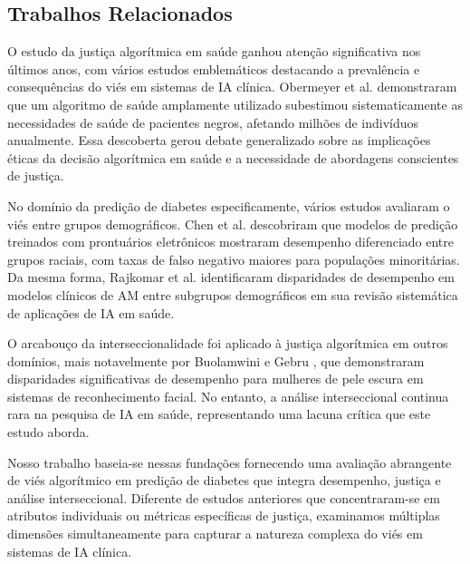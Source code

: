 \subsection{Trabalhos Relacionados}

O estudo da justiça algorítmica em saúde ganhou atenção significativa nos 
últimos anos, com vários estudos emblemáticos destacando a prevalência e 
consequências do viés em sistemas de IA clínica. Obermeyer et al. 
\cite{obermeyer2019} demonstraram que um algoritmo de saúde amplamente 
utilizado subestimou sistematicamente as necessidades de saúde de pacientes 
negros, afetando milhões de indivíduos anualmente. Essa descoberta gerou 
debate generalizado sobre as implicações éticas da decisão algorítmica 
em saúde e a necessidade de abordagens conscientes de justiça.

No domínio da predição de diabetes especificamente, vários estudos avaliaram 
o viés entre grupos demográficos. Chen et al. \cite{chen2019} descobriram 
que modelos de predição treinados com prontuários eletrônicos mostraram 
desempenho diferenciado entre grupos raciais, com taxas de falso negativo 
maiores para populações minoritárias. Da mesma forma, Rajkomar et al. 
\cite{rajkomar2018} identificaram disparidades de desempenho em modelos 
clínicos de AM entre subgrupos demográficos em sua revisão sistemática de 
aplicações de IA em saúde.

O arcabouço da interseccionalidade foi aplicado à justiça algorítmica em 
outros domínios, mais notavelmente por Buolamwini e Gebru \cite{buolamwini2018}, 
que demonstraram disparidades significativas de desempenho para mulheres de 
pele escura em sistemas de reconhecimento facial. No entanto, a análise 
interseccional continua rara na pesquisa de IA em saúde, representando uma 
lacuna crítica que este estudo aborda.

Nosso trabalho baseia-se nessas fundações fornecendo uma avaliação 
abrangente de viés algorítmico em predição de diabetes que integra desempenho, 
justiça e análise interseccional. Diferente de estudos anteriores que 
concentraram-se em atributos individuais ou métricas específicas de justiça, 
examinamos múltiplas dimensões simultaneamente para capturar a natureza 
complexa do viés em sistemas de IA clínica.
